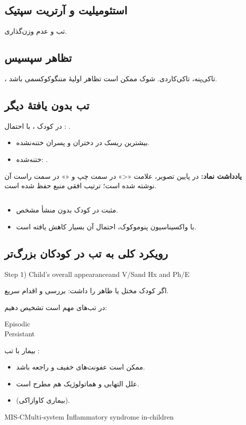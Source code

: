 \documentclass[12pt,a4paper]{article}
\begin{document}
\subsection*{استئومیلیت و آرتریت سپتیک}
تب و عدم وزن‌گذاری.

\subsection*{تظاهر سپسیس}
، تاکی‌پنه، تاکی‌کاردی.
شوک ممکن است تظاهر اولیهٔ مننگوکوکسمی باشد.

\subsection*{تب بدون یافتهٔ دیگر}
در کودک ، با احتمال : .
\begin{itemize}
\item بیشترین ریسک در دختران و پسران ختنه‌نشده.
\item ختنه‌شده: \FeverOlderMath{<}.
\end{itemize}
\textbf{یادداشت نماد:} در پایین تصویر، علامت «<» در سمت چپ و «» در سمت راست آن نوشته شده است؛ ترتیب افقی منبع حفظ شده است.

\subsection*{}
\begin{itemize}
\item {} مثبت در کودک  بدون منشأ مشخص.
\item با واکسیناسیون پنوموکوک، احتمال آن بسیار کاهش یافته است.
\end{itemize}

\subsection*{رویکرد کلی به تب در کودکان بزرگ‌تر}
\begin{latin}
Step 1) Child's overall appearance\quad and V/S\quad and Hx and Ph/E
\end{latin}
\textbf{} اگر کودک  مختل یا ظاهر  را داشت: بررسی و اقدام سریع.

در تب‌های  مهم است تشخیص دهیم:
\begin{latin}
Episodic\\
Persistant
\end{latin}
بیمار با تب :
\begin{itemize}
\item ممکن است عفونت‌های خفیف و راجعه باشد.
\item علل التهابی و هماتولوژیک هم مطرح است.
\item {} (بیماری کاوازاکی).
\end{itemize}
\begin{latin}
MIS-C\quad Multi-system Inflammatory syndrome in-children
\end{latin}
\end{document}
